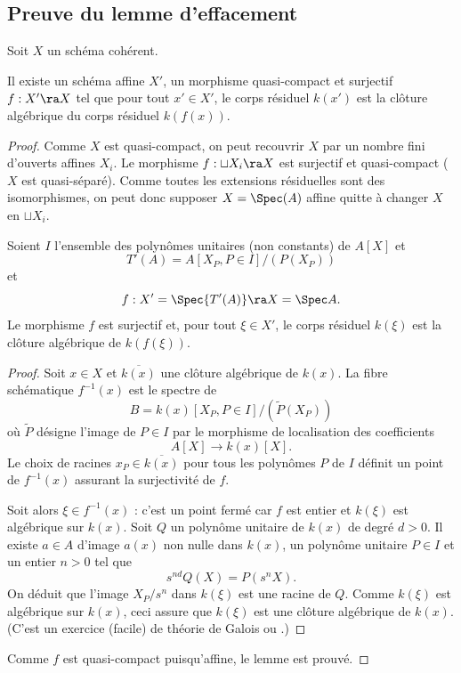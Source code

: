 \documentclass[10pt]{../fichiers-configuration-latex/smfart}
\begin{document}
\subsection{Preuve du lemme d'effacement} Soit $X$ un schéma cohérent.

\begin{lemme2}\label{cres-alg-clos}Il existe un schéma affine $X'$, un morphisme quasi-compact et
surjectif $f:X'\ra X$ tel que pour tout $x'\in X'$, le corps résiduel $k(x')$  est la clôture
algébrique du corps résiduel $k(f(x))$. \end{lemme2}

\begin{proof} Comme $X$ est quasi-compact, on peut recouvrir $X$ par un nombre fini d'ouverts
affines $X_i$. Le morphisme $f:\sqcup X_i\ra X$ est surjectif et quasi-compact ($X$ est
quasi-séparé). Comme toutes les extensions résiduelles sont des isomorphismes, on peut donc supposer
$X=\Spec(A)$ affine quitte à changer $X$ en  $\sqcup X_i$.




\begin{sslemme2}\label{20-c-co} Soient $I$ l'ensemble des polynômes unitaires (non constants) de
$A[X]$ et $$T'(A)=A[X_P, P\in I]/(P(X_P))$$  et $$f:X'=\Spec {T'(A)}\ra X=\Spec A.$$ Le morphisme
$f$ est surjectif et, pour tout $\xi\in X'$, le corps résiduel $k(\xi)$ est la clôture algébrique de
$k(f(\xi))$.\end{sslemme2}

\begin{proof} Soit $x\in X$ et $\overline{k(x)}$ une clôture algébrique de $k(x)$. La fibre
schématique $f^{-1}(x)$ est le spectre de $$B=k(x)[X_P, P\in I]/(\tilde P(X_P))$$ où $\tilde P$
désigne l'image de $P\in I$ par le morphisme de localisation des coefficients $$A[X]\rightarrow
k(x)[X].$$ Le choix de racines $x_P\in \overline{k(x)}$ pour tous les polynômes $P$ de $I$ définit
un point de $f^{-1}(x)$ assurant la surjectivité de $f$.

Soit alors $\xi\in f^{-1}(x)$ : c'est un point fermé car $f$ est entier et $k(\xi)$ est algébrique
sur $k(x)$. Soit $Q$ un polynôme unitaire de $k(x)$ de degré $d>0$. Il existe $a\in A$ d'image
$a(x)$ non nulle dans $k(x)$, un polynôme unitaire $P\in I$ et un entier $n>0$ tel que
$$s^{nd}Q(X)=P(s^nX).$$ On déduit que l'image $X_P/s^n$ dans $k(\xi)$ est une racine de $Q$. Comme
$k(\xi)$ est algébrique sur $k(x)$, ceci assure que $k(\xi)$ est une clôture algébrique de $k(x)$.
(C'est un exercice (facile) de théorie de Galois ou .) \end{proof} Comme
$f$ est quasi-compact puisqu'affine, le lemme est prouvé.  \end{proof}
\end{document}
